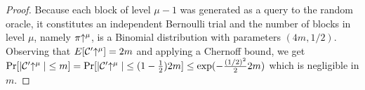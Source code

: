 \begin{proof}
    Because each block of level $\mu - 1$ was generated as a query to the random
    oracle, it constitutes an independent Bernoulli trial and the number of
    blocks in level $\mu$, namely $\pi\negthickspace\uparrow^\mu$, is a Binomial distribution
    with parameters $(4m, 1/2)$. Observing that $E[\mathcal{C}'\negthickspace\uparrow^\mu] = 2m$ and
    applying a Chernoff bound, we get
    $\Pr[|\mathcal{C}'\negthickspace\uparrow^\mu| \leq m]
    = \Pr[|\mathcal{C}'\negthickspace\uparrow^\mu| \leq (1 - \frac{1}{2})2m]
    \leq \exp(-\frac{(1/2)^2}{2} 2m)$ which is negligible in
    $m$.

    \Qed
\end{proof}
